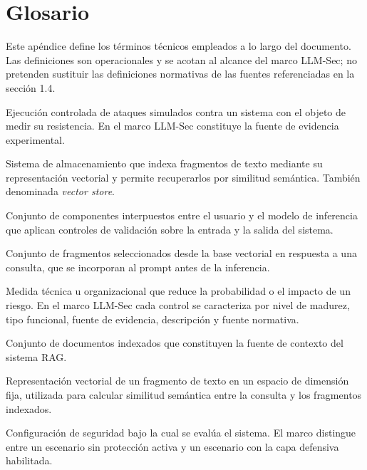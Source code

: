 \chapter{Glosario}
\label{app:glosario}

Este apéndice define los términos técnicos empleados a lo largo del documento. Las definiciones son operacionales y se acotan al alcance del marco LLM-Sec; no pretenden sustituir las definiciones normativas de las fuentes referenciadas en la sección 1.4.

\begin{description}[leftmargin=0pt, style=nextline]

  \item[Auditoría ofensiva] Ejecución controlada de ataques simulados contra un sistema con el objeto de medir su resistencia. En el marco LLM-Sec constituye la fuente de evidencia experimental.

  \item[Base de datos vectorial] Sistema de almacenamiento que indexa fragmentos de texto mediante su representación vectorial y permite recuperarlos por similitud semántica. También denominada \emph{vector store}.

  \item[Capa defensiva] Conjunto de componentes interpuestos entre el usuario y el modelo de inferencia que aplican controles de validación sobre la entrada y la salida del sistema.

  \item[Contexto recuperado] Conjunto de fragmentos seleccionados desde la base vectorial en respuesta a una consulta, que se incorporan al prompt antes de la inferencia.

  \item[Control] Medida técnica u organizacional que reduce la probabilidad o el impacto de un riesgo. En el marco LLM-Sec cada control se caracteriza por nivel de madurez, tipo funcional, fuente de evidencia, descripción y fuente normativa.

  \item[Corpus de conocimiento] Conjunto de documentos indexados que constituyen la fuente de contexto del sistema RAG.

  \item[Embedding] Representación vectorial de un fragmento de texto en un espacio de dimensión fija, utilizada para calcular similitud semántica entre la consulta y los fragmentos indexados.

  \item[Escenario] Configuración de seguridad bajo la cual se evalúa el sistema. El marco distingue entre un escenario sin protección activa y un escenario con la capa defensiva habilitada.


\end{description}
